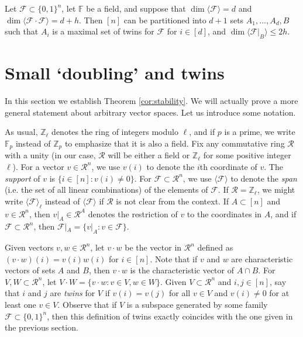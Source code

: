 	
	\begin{theorem}\label{cor:stability}
		Let $\mathcal{F}\subset\{0,1\}^{n}$, let $\mathbb{F}$ be a field, and suppose that $\dim\langle \mathcal{F} \rangle = d$ and $\dim \langle \mathcal{F}\cdot \mathcal{F} \rangle=d+h$. Then $[n]$ can be partitioned into $d+1$ sets $A_1,\dots,A_d,B$ such that $A_{i}$ is a maximal set of twins for $\mathcal{F}$ for $i\in [d]$, and $\dim \langle \mathcal{F}|_{B} \rangle \leq 2h$.
	\end{theorem}
	
	\section{Small `doubling' and twins}
	
	In this section we establish Theorem \ref{cor:stability}. We will actually prove a more general statement about arbitrary vector spaces. Let us introduce some notation. 
	
	As usual, $\mathbb{Z}_{\ell}$ denotes the ring of integers modulo $\ell$, and if $p$ is a prime, we write $\mathbb{F}_p$ instead of $\mathbb{Z}_p$ to emphasize that it is also a field. Fix any commutative ring $\mathcal{R}$ with a unity  (in our case, $\mathcal{R}$ will be either a field or  $\mathbb{Z}_\ell$ for some positive integer $\ell$). For a vector $v \in \mathcal{R}^n$, we use $v(i)$ to denote the $i$th coordinate of $v$. The {\em support} of $v$ is $\{i \in [n] : v(i) \neq 0\}$. For $\mathcal{F}\subset \mathcal{R}^{n}$, we use $\langle \mathcal{F}\rangle$ to denote the \emph{span} (i.e. the set of all linear combinations) of the elements of $\mathcal{F}$. If $\mathcal{R}=\mathbb{Z}_{\ell}$, we might write $\langle \mathcal{F}\rangle_{\ell}$ instead of $\langle \mathcal{F}\rangle$ if $\mathcal{R}$ is not clear from the context. If $A\subset [n]$ and $v \in \mathcal{R}^n$, then $v|_{A}\in \mathcal{R}^{A}$ denotes the restriction of $v$ to the coordinates in $A$, and if $\mathcal{F}\subset \mathcal{R}^{n}$, then $\mathcal{F}|_{A}=\{v|_{A}: v \in \mathcal{F}\}$.
	
	Given vectors $v,w \in \mathcal{R}^n$, let $v\cdot w$ be the vector in $\mathcal{R}^n$ defined as $(v\cdot w)(i)=v(i)w(i)$ for $i\in [n]$. Note that if $v$ and $w$ are characteristic vectors of sets $A$ and $B$, then $v\cdot w$ is the characteristic vector of $A\cap B$. 
	For $V,W \subset \mathcal{R}^{n}$, let $V \cdot W = \{v \cdot w : v \in V, w \in W\}$. 
	Given $V \subset \mathcal{R}^{n}$ and $i,j\in [n]$, say that $i$ and $j$ are \emph{twins} for $V$ if  $v(i)=v(j)$ for all $v\in V$ and $v(i)\neq 0$ for at least one $v\in V$. Observe that if $V$ is a subspace generated by some family $\mathcal{F} \subset \{0,1\}^n$, then this definition of twins exactly coincides with the one given in the previous section.
	
